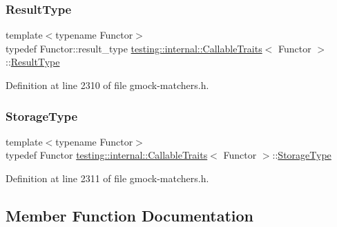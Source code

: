 \subsubsection{\texorpdfstring{Result\+Type}{ResultType}}
{\footnotesize\ttfamily template$<$typename Functor$>$ \\
typedef Functor\+::result\+\_\+type \hyperlink{structtesting_1_1internal_1_1CallableTraits}{testing\+::internal\+::\+Callable\+Traits}$<$ Functor $>$\+::\hyperlink{structtesting_1_1internal_1_1CallableTraits_a242d198dd1c56a153ba931d7166ec7f3}{Result\+Type}}



Definition at line 2310 of file gmock-\/matchers.\+h.

\mbox{\label{structtesting_1_1internal_1_1CallableTraits_a23cc0c86a3bd18b2f8dd159dd44e1168}} 
\subsubsection{\texorpdfstring{Storage\+Type}{StorageType}}
{\footnotesize\ttfamily template$<$typename Functor$>$ \\
typedef Functor \hyperlink{structtesting_1_1internal_1_1CallableTraits}{testing\+::internal\+::\+Callable\+Traits}$<$ Functor $>$\+::\hyperlink{structtesting_1_1internal_1_1CallableTraits_a23cc0c86a3bd18b2f8dd159dd44e1168}{Storage\+Type}}



Definition at line 2311 of file gmock-\/matchers.\+h.



\subsection{Member Function Documentation}
\mbox{\label{structtesting_1_1internal_1_1CallableTraits_ab09a6487235947ec9c5d933d07ac605b}} 
